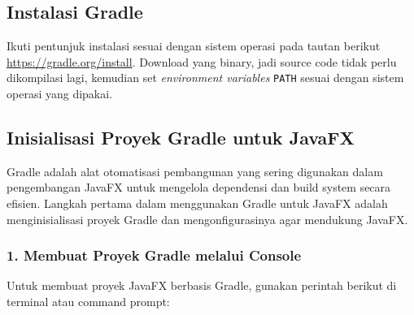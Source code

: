 \subsection{Instalasi Gradle}
Ikuti pentunjuk instalasi sesuai dengan sistem operasi pada tautan berikut \url{https://gradle.org/install}. Download yang binary, jadi source code tidak perlu dikompilasi lagi, kemudian set \textit{environment variables} \texttt{PATH} sesuai dengan sistem operasi yang dipakai.

\subsection{Inisialisasi Proyek Gradle untuk JavaFX}
\label{gradle_javafx}

Gradle adalah alat otomatisasi pembangunan yang sering digunakan dalam pengembangan JavaFX untuk mengelola dependensi dan build system secara efisien. Langkah pertama dalam menggunakan Gradle untuk JavaFX adalah menginisialisasi proyek Gradle dan mengonfigurasinya agar mendukung JavaFX.



\subsubsection{1. Membuat Proyek Gradle melalui Console}

Untuk membuat proyek JavaFX berbasis Gradle, gunakan perintah berikut di terminal atau command prompt:

